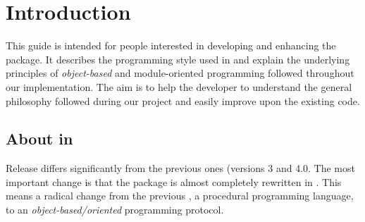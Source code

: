 \chapter{Introduction}


This guide is intended for people interested in developing and enhancing
the \PR package. It describes the \fort programming style used in \PR and
explain the underlying principles of {\em object-based} and module-oriented
programming followed throughout our implementation.  The aim is to help the
developer to understand the general philosophy followed during our project
and easily improve upon the existing code.

\section{About \fort in \PR}

Release \PR differs significantly from the previous ones (versions 3  and
4.0.  The most important change is that the package is almost completely
rewritten in \fort. This means a radical change from the previous \oldfort,
a procedural programming language, to an {\em object-based/oriented}
programming protocol.

